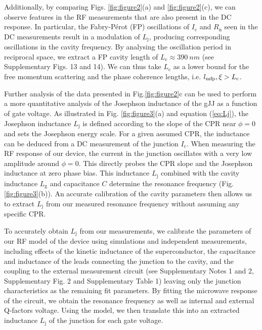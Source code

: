 \documentclass[preprint,
  onecolumn,
  notitlepage,
  amsmath,amssymb,
  aip,
  apl,
]{revtex4-1}
\begin{document}
Additionally, by comparing Figs. \ref{fig:figure2}(a) and \ref{fig:figure2}(c), we can observe features in the RF measurements that are also present in the DC response.
In particular, the Fabry-P\'erot (FP) oscillations of $I_\textrm{c}$ and $R_\textrm{n}$ seen in the DC measurements result in a modulation of $L_\textrm{j}$, producing corresponding oscillations in the cavity frequency.
By analysing the oscillation period in reciprocal space, we extract a FP cavity length of $L_\textrm{c}\approx \SI{390}{nm}$ (see Supplementary Figs. 13 and 14).
We can thus take $L_\textrm{c}$ as a lower bound for the free momentum scattering and the phase coherence lengths, i.e. $l_{\rm mfp},\xi>L_\textrm{c}$.

Further analysis of the data presented in Fig.\ref{fig:figure2}c can be used to perform a more quantitative analysis of the Josephson inductance of the gJJ as a function of gate voltage.
As illustrated in Fig. \ref{fig:figure3}(a) and equation (\ref{eq:Lj}), the Josephson inductance $L_\textrm{j}$ is defined according to the slope of the CPR near $\phi=0$ and sets the Josephson energy scale.
For a given assumed CPR, the inductance can be deduced from a DC measurement of the junction $I_\textrm{c}$.
When measuring the RF response of our device, the current in the junction oscillates with a very low amplitude around $\phi=0$.
This directly probes the CPR slope and the Josephson inductance at zero phase bias.
This inductance $L_\textrm{j}$ combined with the cavity inductance $L_\textrm{g}$ and capacitance $C$ determine the resonance frequency (Fig. \ref{fig:figure3}(b)).
An accurate calibration of the cavity parameters then allows us to extract $L_\textrm{j}$ from our measured resonance frequency without assuming any specific CPR.

To accurately obtain $L_\textrm{j}$ from our measurements, we calibrate the parameters of our RF model of the device using simulations and independent measurements, including effects of the kinetic inductance of the superconductor, the capacitance and inductance of the leads connecting the junction to the cavity, and the coupling to the external measurement circuit (see Supplementary Notes 1 and 2, Supplementary Fig. 2 and Supplementary Table 1) leaving only the junction characteristics as the remaining fit parameters.
By fitting the microwave response of the circuit, we obtain the resonance frequency as well as internal and external Q-factors voltage.
Using the model, we then translate this into an extracted inductance $L_\textrm{j}$ of the junction for each gate voltage.
\end{document}
